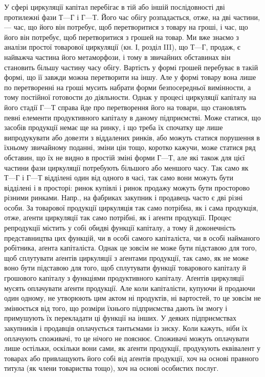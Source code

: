 У сфері циркуляції капітал перебігає в тій або іншій послідовності
дві протилежні фази $Т — Г$ і $Г — Т$. Його час обігу розпадається, отже,
на дві частини, — час, що його він потребує, щоб перетворитися з товару
на гроші, і час, що його він потребує, щоб перетворитися з грошей на
товар. Ми вже знаємо з аналізи простої товарової циркуляції (кн. І,
розділ III), що $Т — Г$, продаж, є найважча частина його метаморфози,
і тому в звичайних обставинах він становить більшу частину часу
обігу. Вартість у формі грошей перебуває в такій формі, що її завжди
можна перетворити на іншу. Але у формі товару вона лише по перетворенні
на гроші мусить набрати форми безпосередньої вимінности,
а тому постійної готовости до діяльности. Однак у процесі циркуляції
капіталу на його стадії $Г — Т$ справа йде про перетворення його на
товари, що становлять певні елементи продуктивного капіталу в даному
підприємстві. Може статися, що засобів продукції немає ще на ринку, і
що треба їх спочатку ще лише випродукувати або довезти з віддалених
ринків, або можуть статися порушення в їхньому звичайному поданні,
зміни цін тощо, коротко кажучи, може статися ряд обставин, що
їх не видно в простій зміні форми $Г — Т$, але які також для цієї частини
фази циркуляції потребують більшого або меншого часу. Так само як
$Т — Г$ і $Г — Т$ відділені один від одного в часі, так само вони можуть
бути відділені і в просторі: ринок купівлі і ринок продажу можуть бути
просторово різними ринками. Напр., на фабриках закупник і продавець
часто є дві різні особи. За товарової продукції циркуляція так само
потрібна, як і сама продукція, отже, аґенти циркуляції так само потрібні,
як і аґенти продукції. Процес репродукції містить у собі обидві функції
капіталу, а тому й доконечність представництва цих функцій, чи в особі
самого капіталіста, чи в особі найманого робітника, аґента капіталіста.
Однак це зовсім не може бути підставою для того, щоб сплутувати
аґентів циркуляції з аґентами продукції, так само, як не може воно
бути підставою для того, щоб сплутувати функції товарового капіталу
й грошового капіталу з функціями продуктивного капіталу. Аґентів циркуляції
мусять оплачувати аґенти продукції. Але коли капіталісти, купуючи
й продаючи один одному, не утворюють цим актом ні продуктів, ні
вартостей, то це зовсім не змінюється від того, що розміри їхнього
підприємства дають їм змогу і примушують їх перекладати ці функції на
інших. У деяких підприємствах закупників і продавців оплачується
тантьємами із зиску. Коли кажуть, ніби їх оплачують споживачі, то це
нічого не пояснює. Споживачі можуть оплачувати лише остільки, оскільки
вони сами, як аґенти продукції, продукують еквівалент у товарах або
привлащують його собі від аґентів продукції, хоч на основі правного титула
(як члени товариства тощо), хоч на основі особистих послуг.

